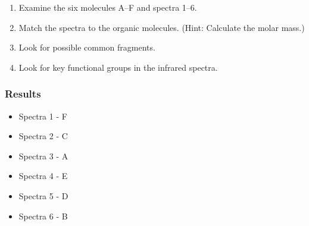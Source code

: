 \documentclass{report}
\begin{document}
		\begin{enumerate}
			\item Examine the six molecules A–F and spectra 1–6.
			\item Match the spectra to the organic molecules. (Hint: Calculate the molar mass.)
			\item Look for possible common fragments.
			\item Look for key functional groups in the infrared spectra.
		\end{enumerate}

	\subsubsection{Results}
	
		\begin{itemize}
			\item Spectra 1 - F
			\item Spectra 2 - C
			\item Spectra 3 - A
			\item Spectra 4 - E
			\item Spectra 5 - D
			\item Spectra 6 - B
		\end{itemize}
\end{document}
